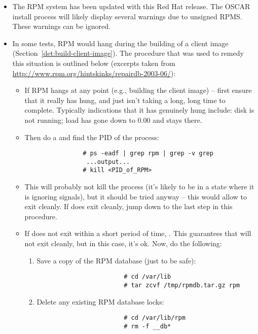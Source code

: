 \begin{itemize}

\item The RPM system has been updated with this Red Hat release.  The
 OSCAR install process will likely display several warnings due to unsigned
 RPMS.  These warnings can be ignored. 

\item In some tests, RPM would hang during the building of a client image
(Section~\ref{det:build-client-image}).  The procedure that was used to
remedy this situation is outlined below (excerpts taken from
\url{http://www.rpm.org/hintskinks/repairdb-2003-06/}):
	\begin{itemize}
		\item If RPM hangs at any point (e.g., building the client image)
		-- first ensure that it really has hung, and just isn't taking a
		long, long time to complete.  Typically indications that it has
		genuinely hung include: disk is not running; load has gone
		down to 0.00 and stays there.

		\item Then do a  and find the PID of the  process: 
			\begin{verbatim}
				# ps -eadf | grep rpm | grep -v grep
				 ...output...
				# kill <PID_of_RPM>
			\end{verbatim}

		\item This will probably not kill the process (it's likely to be in
		a state where it is ignoring signals), but it should be tried
		anyway -- this would allow  to exit cleanly.  If  
		does  exit cleanly, jump down to the last step in this procedure.

		\item If  does not exit within a short period of time,
		.  This guarantees that  will
		not exit cleanly, but in this case, it's ok.  Now, do the
		following:
			\begin{enumerate}
				\item Save a copy of the RPM database (just to be safe):
					\begin{verbatim}
						# cd /var/lib
						# tar zcvf /tmp/rpmdb.tar.gz rpm
					\end{verbatim}

				\item Delete any existing RPM database locks:
					\begin{verbatim}
						# cd /var/lib/rpm
						# rm -f __db*
					\end{verbatim}


\end{enumerate}
\end{itemize}
\end{itemize}
